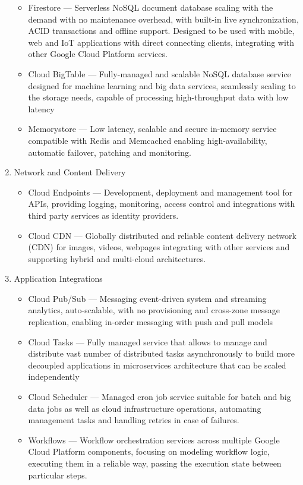 \begin{enumerate}
\begin{itemize}
       \item Firestore --- Serverless NoSQL document database scaling with the demand with no maintenance overhead, with built-in live synchronization, ACID transactions and offline support. Designed to be used with mobile, web and IoT applications with direct connecting clients, integrating with other Google Cloud Platform services.
       \item Cloud BigTable --- Fully-managed and scalable NoSQL database service designed for machine learning and big data services, seamlessly scaling to the storage needs, capable of processing high-throughput data with low latency
       \item Memorystore --- Low latency, scalable and secure in-memory service compatible with Redis and Memcached enabling high-availability, automatic failover, patching and monitoring.
   \end{itemize}
   \item Network and Content Delivery
   \begin{itemize}
       \item Cloud Endpoints --- Development, deployment and management tool for APIs, providing logging, monitoring, access control and integrations with third party services as identity providers.
       \item Cloud CDN --- Globally distributed and reliable content delivery network (CDN) for images, videos, webpages integrating with other services and supporting hybrid and multi-cloud architectures.
   \end{itemize}
   \item Application Integrations
   \begin{itemize}
       \item Cloud Pub/Sub --- Messaging event-driven system and streaming analytics, auto-scalable, with no provisioning and cross-zone message replication, enabling in-order messaging with push and pull models
       \item Cloud Tasks --- Fully managed service that allows to manage and distribute vast number of distributed tasks asynchronously to build more decoupled applications in microservices architecture that can be scaled independently
       \item Cloud Scheduler --- Managed cron job service suitable for batch and big data jobs as well as cloud infrastructure operations, automating management tasks and handling retries in case of failures.
       \item Workflows --- Workflow orchestration services across multiple Google Cloud Platform components, focusing on modeling workflow logic, executing them in a reliable way, passing the execution state between particular steps.

\end{itemize}
\end{enumerate}
